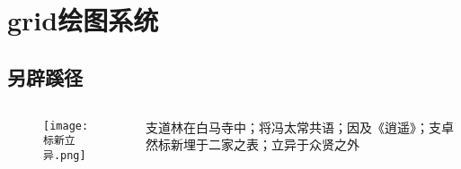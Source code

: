 

\section{grid绘图系统}
\subsection{另辟蹊径}
\begin{frame}{\subsecname}{}
  \begin{columns}
    \begin{column}{.5\textwidth}
      \begin{figure}
        \centering \texttt{[image: 标新立异.png]}
      \end{figure}
    \end{column}

    \begin{column}{.48\textwidth}
      \begin{ornamentblock}
        \centering
        {支道林在白马寺中；将冯太常共语；因及《逍遥》；支卓然标新埋于二家之表；立异于众贤之外\\
          }
      \end{ornamentblock}
    \end{column}
  \end{columns}
\end{frame}

